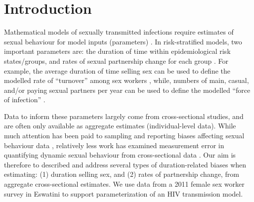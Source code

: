 \section{Introduction}
Mathematical models of sexually transmitted infections require
estimates of sexual behaviour for model inputs (parameters) \cite{Garnett2002}.
In risk-stratified models, two important parameters are:
the duration of time within epidemiological risk states/groups, and
rates of sexual partnership change for each group
\cite{Garnett2002,Watts2010,Boily2015,Knight2020}.
For example, the average duration of time selling sex can be used to define
the modelled rate of ``turnover'' among sex workers \cite{Knight2020},
while, numbers of main, casual, and/or paying sexual partners per year
can be used to define the modelled ``force of infection'' \cite{Boily2015}.
\par
Data to inform these parameters largely come from cross-sectional studies,
and are often only available as aggregate estimates (\vs individual-level data).
While much attention has been paid to
sampling and reporting biases affecting sexual behaviour data \cite{Fenton2001,Langhaug2010},
relatively less work has examined measurement error
in quantifying dynamic sexual behaviour from cross-sectional data \cite{Burington2010,Fazito2012}.
Our aim is therefore to described and address
several types of duration-related biases when estimating:
(1) duration selling sex, and (2) rates of partnership change,
from aggregate cross-sectional estimates.
We use data from a 2011 female sex worker survey in Eswatini \cite{Yam2013}
to support parameterization of an HIV transmission model.
